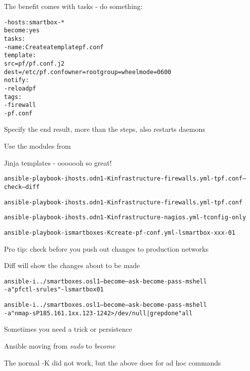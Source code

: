 \documentclass[18pt,landscape,a4paper,footrule]{foils}
\begin{document}
The benefit comes with tasks - do something:

\begin{alltt}\footnotesize
  - hosts: smartbox-*
    become: yes
    tasks:
    - name: Create a template pf.conf
      template:
        src=pf/pf.conf.j2
        dest=/etc/pf.conf owner=root group=wheel mode=0600
     notify:
        - reload pf
      tags:
        - firewall
        - pf.conf
\end{alltt}

\begin{list2}
\item Specify the end result, more than the steps, also restarts daemons
\item Use the modules from\\
\item Jinja templates - ooooooh so great!
\end{list2}


\begin{alltt}\footnotesize
ansible-playbook -i hosts.odn1 -K infrastructure-firewalls.yml -t pf.conf --check --diff

ansible-playbook -i hosts.odn1 -K infrastructure-firewalls.yml -t pf.conf

ansible-playbook -i hosts.odn1 -K infrastructure-nagios.yml -t config-only

ansible-playbook -i smartboxes -K create-pf-conf.yml -l smartbox-xxx-01
\end{alltt}

\begin{list2}
\item Pro tip: check before you push out changes to production networks \smiley
\item Diff will show the changes about to be made
\end{list2}


\begin{alltt}\footnotesize
ansible -i ../smartboxes.osl1 --become --ask-become-pass -m shell
-a "pfctl -s rules" -l smartbox01

ansible -i ../smartboxes.osl1 --become --ask-become-pass -m shell
-a "nmap -sP 185.161.1xx.123-124 2> /dev/null| grep done" all
\end{alltt}

\begin{list2}
\item Sometimes you need a trick or persistence
\item Ansible moving from \emph{sudo} to \emph{become}
\item The normal -K did not work, but the above does for ad hoc commands
\end{list2}
\end{document}
